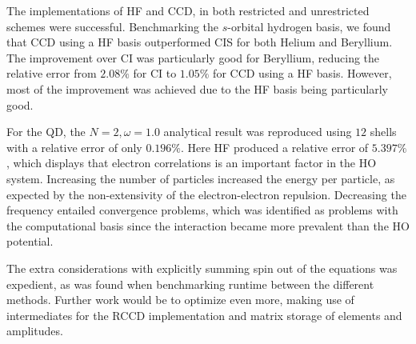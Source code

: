 The implementations of HF and CCD, in both restricted and unrestricted schemes were successful. Benchmarking the $s$-orbital hydrogen basis, we found that CCD using a HF basis outperformed CIS for both Helium and Beryllium. The improvement over CI was particularly good for Beryllium, reducing the relative error from $2.08\%$ for CI to $1.05\%$ for CCD using a HF basis. However, most of the improvement was achieved due to the HF basis being particularly good.

For the QD, the $N = 2, \omega = 1.0$ analytical result was reproduced using $12$ shells with a relative error of only $0.196\%$. Here HF produced a relative error of $5.397\%$, which displays that electron correlations is an important factor in the HO system. Increasing the number of particles increased the energy per particle, as expected by the non-extensivity of the electron-electron repulsion. Decreasing the frequency  entailed convergence problems, which was identified as problems with the computational basis since the interaction became more prevalent than the HO potential.

The extra considerations with explicitly summing spin out of the equations was expedient, as was found when benchmarking runtime between the different methods. Further work would be to optimize even more, making use of intermediates for the RCCD implementation and matrix storage of elements and amplitudes.